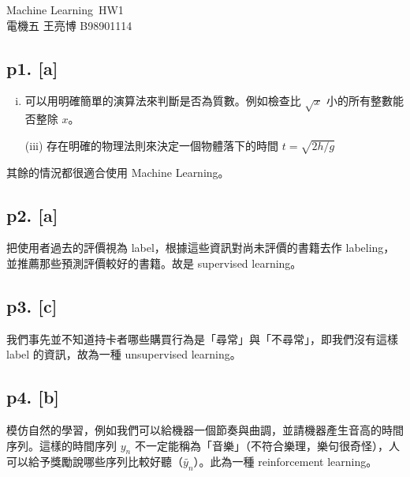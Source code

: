 

\newcommand{\link}[2]{ \href{#1}{\textcolor{Gray}{#2}}}
\newcommand{\statatab}[1]{
\begin{table}[H]\centering\begin{threeparttable}
\end{threeparttable}\end{table}}

\usepackage{mathabx}

\setlength{\baselineskip}{1.5em}
\setlength{\parskip}{0.5em}

\begin{center}
{\optima\LARGE Machine Learning~HW1}\\[0.5em]
電機五 王亮博 B98901114
\end{center}
\subsection*{p1. [a]}
\begin{enumerate}[(i)]
\item 可以用明確簡單的演算法來判斷是否為質數。例如檢查比 $\sqrt{x}$ 小的所有整數能否整除 $x$。
\item[(iii)] 存在明確的物理法則來決定一個物體落下的時間 $t = \sqrt{2h/g}$
\end{enumerate}
其餘的情況都很適合使用 Machine Learning。

\subsection*{p2. [a]}
把使用者過去的評價視為 label，根據這些資訊對尚未評價的書籍去作 labeling，並推薦那些預測評價較好的書籍。故是 supervised learning。

\subsection*{p3. [c]}
我們事先並不知道持卡者哪些購買行為是「尋常」與「不尋常」，即我們沒有這樣 label 的資訊，故為一種 unsupervised learning。

\subsection*{p4. [b]}
模仿自然的學習，例如我們可以給機器一個節奏與曲調，並請機器產生音高的時間序列。這樣的時間序列 $y_n$ 不一定能稱為「音樂」（不符合樂理，樂句很奇怪），人可以給予獎勵說哪些序列比較好聽（$\tilde{y_n}$）。此為一種 reinforcement learning。

